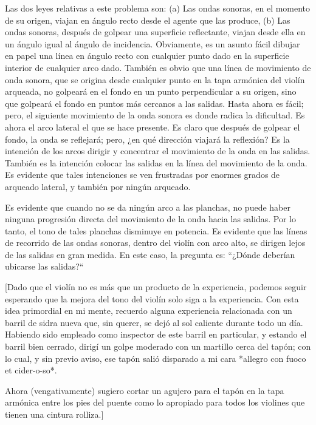 \documentclass[12pt]{book}
\begin{document}
Las dos leyes relativas a este problema son: (a) Las ondas sonoras, en el momento de su origen, viajan en ángulo recto desde el agente que las produce, (b) Las ondas sonoras, después de golpear una superficie reflectante, viajan desde ella en un ángulo igual al ángulo de incidencia. Obviamente, es un asunto fácil dibujar en papel una línea en ángulo recto con cualquier punto dado en la superficie interior de cualquier arco dado. También es obvio que una línea de movimiento de onda sonora, que se origina desde cualquier punto en la tapa armónica del violín arqueada, no golpeará en el fondo en un punto perpendicular a su origen, sino que golpeará el fondo en puntos más cercanos a las salidas. Hasta ahora es fácil; pero, el siguiente movimiento de la onda sonora es donde radica la dificultad. Es ahora el arco lateral el que se hace presente. Es claro que después de golpear el fondo, la onda se reflejará; pero, ¿en qué dirección viajará la reflexión? Es la intención de los arcos dirigir y concentrar el movimiento de la onda en las salidas. También es la intención colocar las salidas en la línea del movimiento de la onda. Es evidente que tales intenciones se ven frustradas por enormes grados de arqueado lateral, y también por ningún arqueado.

Es evidente que cuando no se da ningún arco a las planchas, no puede haber ninguna progresión directa del movimiento de la onda hacia las salidas. Por lo tanto, el tono de tales planchas disminuye en potencia. Es evidente que las líneas de recorrido de las ondas sonoras, dentro del violín con arco alto, se dirigen lejos de las salidas en gran medida. En este caso, la pregunta es: ``¿Dónde deberían ubicarse las salidas?``

[Dado que el violín no es más que un producto de la experiencia, podemos seguir esperando que la mejora del tono del violín solo siga a la experiencia. Con esta idea primordial en mi mente, recuerdo alguna experiencia relacionada con un barril de sidra nueva que, sin querer, se dejó al sol caliente durante todo un día. Habiendo sido empleado como inspector de este barril en particular, y estando el barril bien cerrado, dirigí un golpe moderado con un martillo cerca del tapón; con lo cual, y sin previo aviso, ese tapón salió disparado a mi cara *allegro con fuoco et cider-o-so*.

Ahora (vengativamente) sugiero cortar un agujero para el tapón en la tapa armónica entre los pies del puente como lo apropiado para todos los violines que tienen una cintura rolliza.]
\end{document}
